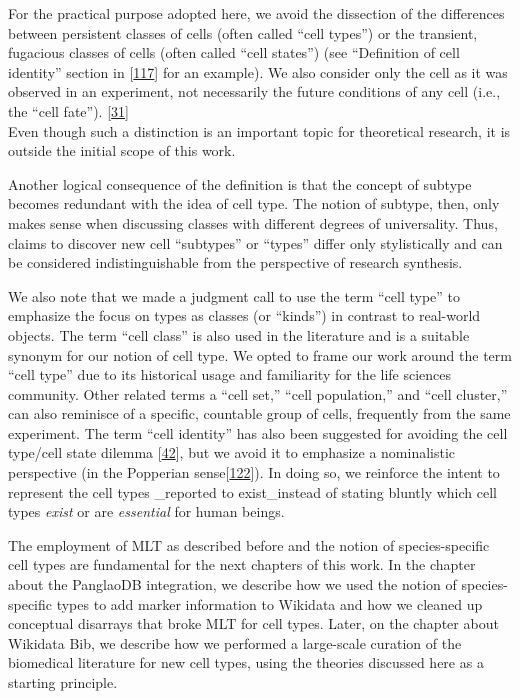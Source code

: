 For the practical purpose adopted here, we avoid the dissection of the differences between persistent classes of cells (often called ``cell types'') or the transient, fugacious classes of cells (often called ``cell states'') (see ``Definition of cell identity'' section in {[}\protect\hyperlink{ref-pFijpXkl}{117}{]} for an example). We also consider only the cell as it was observed in an experiment, not necessarily the future conditions of any cell (i.e., the ``cell fate''). {[}\protect\hyperlink{ref-OjxQDZpx}{31}{]}\\
Even though such a distinction is an important topic for theoretical research, it is outside the initial scope of this work.

Another logical consequence of the definition is that the concept of subtype becomes redundant with the idea of cell type.
The notion of subtype, then, only makes sense when discussing classes with different degrees of universality.
Thus, claims to discover new cell ``subtypes'' or ``types'' differ only stylistically and can be considered indistinguishable from the perspective of research synthesis.

We also note that we made a judgment call to use the term ``cell type'' to emphasize the focus on types as classes (or ``kinds'') in contrast to real-world objects.
The term ``cell class'' is also used in the literature and is a suitable synonym for our notion of cell type.
We opted to frame our work around the term ``cell type'' due to its historical usage and familiarity for the life sciences community.
Other related terms a ``cell set,'' ``cell population,'' and ``cell cluster,'' can also reminisce of a specific, countable group of cells, frequently from the same experiment.
The term ``cell identity'' has also been suggested for avoiding the cell type/cell state dilemma {[}\protect\hyperlink{ref-WKbly37M}{42}{]}, but we avoid it to emphasize a nominalistic perspective (in the Popperian sense{[}\protect\hyperlink{ref-1C6LI68h6}{122}{]}).
In doing so, we reinforce the intent to represent the cell types \_reported to exist\_instead of stating bluntly which cell types \emph{exist} or are \emph{essential} for human beings.

The employment of MLT as described before and the notion of species-specific cell types are fundamental for the next chapters of this work.
In the chapter about the PanglaoDB integration, we describe how we used the notion of species-specific types to add marker information to Wikidata and how we cleaned up conceptual disarrays that broke MLT for cell types.
Later, on the chapter about Wikidata Bib, we describe how we performed a large-scale curation of the biomedical literature for new cell types, using the theories discussed here as a starting principle.

